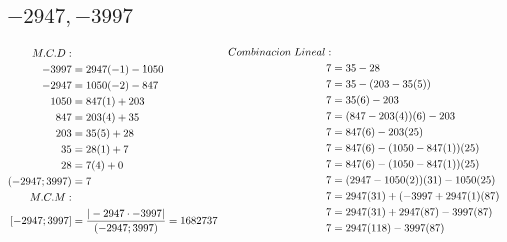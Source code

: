 \documentclass[12pt]{article}
\begin{document}
        \subsection{$-2947,-3997$}
            \begin{equation*}
                \begin{aligned}[c]
                    M.C.D: \\
                    -3997 &= 2947(-1) - 1050 \\
                    -2947 &= 1050(-2)-847\\
                    1050 &= 847(1)+203 \\
                    847 &= 203(4)+35 \\
                    203 &= 35(5)+28 \\
                    35 &= 28(1) +7 \\
                    28 &= 7(4)+0 \\
                    (-2947;3997) &= 7 \\
                    M.C.M: \\
                    \notag [-2947;3997] &= \frac{|-2947 \cdot -3997|}{(-2947;3997)} = 1682737
                \end{aligned}
                \begin{aligned}[c]
                Combinacion \; Lineal: \\
                    \notag 7 &= 35-28 \\
                    \notag 7 &= 35 -(203-35(5)) \\
                    \notag 7 &= 35(6) - 203 \\
                    \notag 7 &= (847 - 203(4))(6)-203 \\
                    \notag 7 &= 847(6)-203(25) \\
                    \notag 7 &= 847(6) - (1050-847(1))(25) \\
                    \notag 7 &= 847(6)-(1050-847(1))(25)\\
                    \notag 7 &= (2947-1050(2))(31)-1050(25)\\
                    \notag 7 &= 2947(31)+(-3997+2947(1)(87)\\
                    \notag 7 &= 2947(31)+2947(87)-3997(87)\\
                    \notag 7 &= 2947(118)-3997(87) \\
                \end{aligned}
            \end{equation*}
\end{document}
